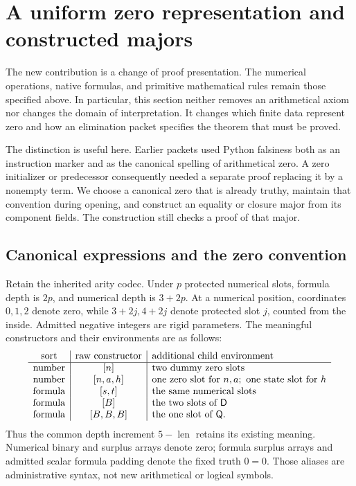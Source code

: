 \section{A uniform zero representation and constructed majors}
\label{truthy:section}

The new contribution is a change of proof presentation.  The numerical
operations, native formulas, and primitive mathematical rules remain
those specified above.  In particular, this section neither removes an
arithmetical axiom nor changes the domain of interpretation.  It changes
which finite data represent zero and how an elimination packet specifies
the theorem that must be proved.

The distinction is useful here.  Earlier packets used Python falsiness
both as an instruction marker and as the canonical spelling of
arithmetical zero.  A zero initializer or predecessor consequently needed
a separate proof replacing it by a nonempty term.  We choose a canonical
zero that is already truthy, maintain that convention during opening,
and construct an equality or closure major from its component fields.
The construction still checks a proof of that major.

\subsection{Canonical expressions and the zero convention}

Retain the inherited arity codec.  Under \(p\) protected numerical slots,
formula depth is \(2p\), and numerical depth is \(3+2p\).
At a numerical position, coordinates \(0,1,2\) denote zero, while
\(3+2j,4+2j\) denote protected slot \(j\), counted from the inside.
Admitted negative integers are rigid parameters.  The meaningful
constructors and their environments are as follows:
\[
\begin{array}{c|c|l}
\text{sort}&\text{raw constructor}&\text{additional child environment}\\ \hline
\text{number}&[n]&\text{two dummy zero slots}\\
\text{number}&[n,a,h]&
 \text{one zero slot for }n,a;\ \text{one state slot for }h\\
\text{formula}&[s,t]&\text{the same numerical slots}\\
\text{formula}&[B]&\text{the two slots of }\mathsf D\\
\text{formula}&[B,B,B]&\text{the one slot of }\mathsf Q .
\end{array}
\]
Thus the common depth increment \(5-\operatorname{len}\) retains its
existing meaning.  Numerical binary and surplus arrays denote zero;
formula surplus arrays and admitted scalar formula padding denote the
fixed truth \(0=0\).  Those aliases are administrative syntax, not new
arithmetical or logical symbols.

